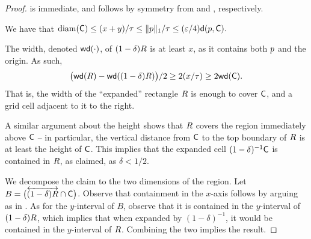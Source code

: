 \documentclass[12pt]{article}%
\begin{document}
\begin{proof}
     is immediate,  and 
    follows by symmetry from  and ,
    respectively.

    \smallskip%
    \noindent%
     We have that
    \begin{math}
        \diameterX{\cell}%
        \leq%
        (x+y) /\gConst%
        \leq%
        \|\pa\|_1 /\gConst \leq %
        (\eps/4) \dsY{\pa}{\cell}.
    \end{math}

    \smallskip%
    \noindent%
     The width, denoted $\widthX{\cdot}$, of
    $(1-\delta)R$ is at least $x$, as it contains both $p$ and
    the origin. As such,
    \begin{equation*}
        \bigl( \widthX{\rect} - \widthX{(1-\delta)\rect} \bigr)/2 \geq
        2(x /\tau) \geq 2 \widthX{\cell}.
    \end{equation*}
    That is, the width of the ``expanded'' rectangle $R$ is enough
    to cover $\mathsf{C}$, and a grid cell adjacent to it to the right.

    A similar argument about the height shows that $R$ covers the
    region immediately above $\mathsf{C}$ -- in particular, the vertical
    distance from $\mathsf{C}$ to the top boundary of $R$ is at least
    the height of $\mathsf{C}$. This implies that the expanded cell
    $(1-\delta)^{-1}\mathsf{C}$ is contained in $R$, as claimed, as
    $\delta < 1/2$.


    \smallskip%
    \noindent%
     We decompose the claim to the two dimensions of the
    region. Let
    $B = \bigl(\overleftrightarrow{ (1-\delta)R} \cap \mathsf{C}
    \bigr)$. Observe that containment in the $x$-axis follows by
    arguing as in . As for the $y$-interval of $B$,
    observe that it is contained in the $y$-interval of
    $(1-\delta)R$, which implies that when expanded by
    $(1-\delta)^{-1}$, it would be contained in the $y$-interval of
    $R$. Combining the two implies the result.
\end{proof}
\end{document}

